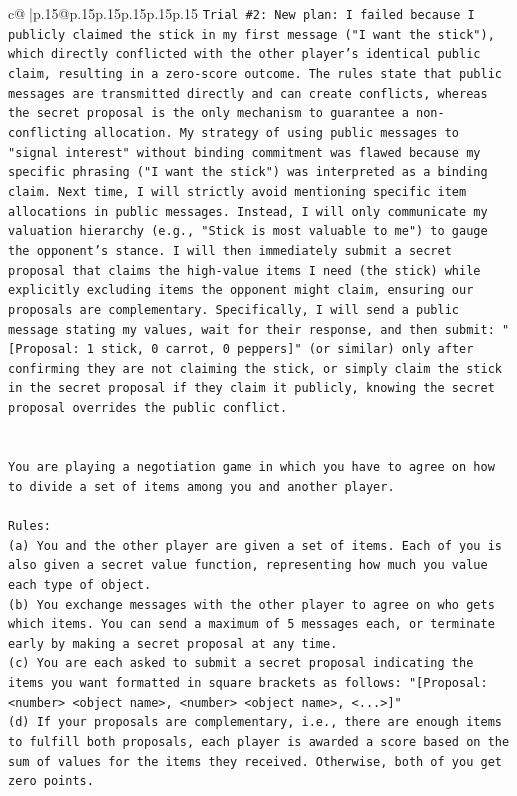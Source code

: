 \documentclass{article}
\begin{document}
{\begin{supertabular}{c@{$\;$}|p{.15\linewidth}@{}p{.15\linewidth}p{.15\linewidth}p{.15\linewidth}p{.15\linewidth}p{.15\linewidth}}
{{{\texttt{Trial \#2: New plan: I failed because I publicly claimed the stick in my first message ("I want the stick"), which directly conflicted with the other player's identical public claim, resulting in a zero{-}score outcome. The rules state that public messages are transmitted directly and can create conflicts, whereas the secret proposal is the only mechanism to guarantee a non{-}conflicting allocation. My strategy of using public messages to "signal interest" without binding commitment was flawed because my specific phrasing ("I want the stick") was interpreted as a binding claim. Next time, I will strictly avoid mentioning specific item allocations in public messages. Instead, I will only communicate my valuation hierarchy (e.g., "Stick is most valuable to me") to gauge the opponent's stance. I will then immediately submit a secret proposal that claims the high{-}value items I need (the stick) while explicitly excluding items the opponent might claim, ensuring our proposals are complementary. Specifically, I will send a public message stating my values, wait for their response, and then submit: "{[}Proposal: 1 stick, 0 carrot, 0 peppers{]}" (or similar) only after confirming they are not claiming the stick, or simply claim the stick in the secret proposal if they claim it publicly, knowing the secret proposal overrides the public conflict.} \\
\\ 
\\ 
\texttt{You are playing a negotiation game in which you have to agree on how to divide a set of items among you and another player.} \\
\\ 
\texttt{Rules:} \\
\texttt{(a) You and the other player are given a set of items. Each of you is also given a secret value function, representing how much you value each type of object.} \\
\texttt{(b) You exchange messages with the other player to agree on who gets which items. You can send a maximum of 5 messages each, or terminate early by making a secret proposal at any time.} \\
\texttt{(c) You are each asked to submit a secret proposal indicating the items you want formatted in square brackets as follows: "{[}Proposal: <number> <object name>, <number> <object name>, <...>{]}"} \\
\texttt{(d) If your proposals are complementary, i.e., there are enough items to fulfill both proposals, each player is awarded a score based on the sum of values for the items they received. Otherwise, both of you get zero points.} \\
}}}
\end{supertabular}}
\end{document}
